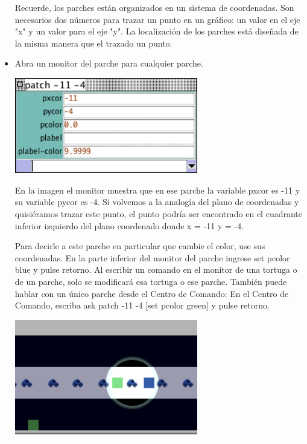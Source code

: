 \documentclass[12pt,letterpaper]{article}
\begin{document}
\begin{itemize}
Recuerde, los parches están organizados en un sistema de coordenadas. Son necesarios dos números para trazar un punto en un gráfico: un valor en el eje "x"  y un valor para el eje "y". La localización de los parches está diseñada de la misma manera que el trazado un punto.

\item Abra un monitor del parche para cualquier parche.

\begin{center}
	\includegraphics[width=8cm]{./imagenes/image12.png}
\end{center}

En la imagen el monitor muestra que en ese parche la variable pxcor  es -11 y su variable pycor  es -4. Si volvemos a la analogía del plano de coordenadas y quisiéramos trazar este punto, el punto podría ser encontrado en el cuadrante inferior izquierdo del plano coordenado donde x = -11 y = -4.

Para decirle a este parche en particular que cambie el color, use sus coordenadas.
En la parte inferior del monitor del parche ingrese set pcolor blue y pulse retorno.
Al escribir un comando en el monitor de una tortuga o de un parche, solo se modificará esa tortuga o ese parche.
También puede hablar con un único parche desde el Centro de Comando:
En el Centro de Comando, escriba ask patch -11 -4 [set pcolor green] y pulse retorno.


\begin{center}
	\includegraphics[width=8cm]{./imagenes/image13.png}
\end{center}


\end{itemize}
\end{document}
